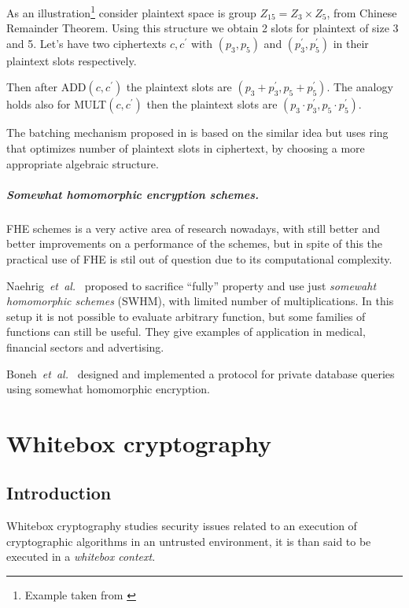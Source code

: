 \documentclass[11pt,oneside,final]{fithesis2}
\newcommand{\eal}{\emph{et~al.}}
\begin{document}
    As an illustration\footnote{Example taken from \citep{gentryAfrica}} consider plaintext space is group $Z_{15} = Z_3 \times Z_5$, from Chinese Remainder Theorem.
    Using this structure we obtain 2 slots for plaintext of size 3 and 5. Let's have two ciphertexts $c, c^{\prime}$
    with $(p_3, p_5)$ and $(p_3^{\prime}, p_5^{\prime})$ in their plaintext slots respectively. 

    Then after ADD$(c,c^{\prime})$ the plaintext slots are $(p_3 + p_3^{\prime}, p_5 + p_5^{\prime})$. The analogy holds also for 
    MULT$(c,c^{\prime})$ then the plaintext slots are $(p_3 \cdot p_3^{\prime}, p_5 \cdot p_5^{\prime})$.
    
    The batching mechanism proposed in \citep{Brakerski:2012:FHE:2090236.2090262} is based on the similar idea but uses 
    ring that optimizes number of plaintext slots in ciphertext, by choosing a more appropriate algebraic structure.

    \paragraph*{Somewhat homomorphic encryption schemes.} 
    FHE schemes is a very active area of research nowadays, with still better and better improvements on a performance of the schemes,
    but in spite of this the practical use of FHE is stil out of question due to its computational complexity. 
    
    Naehrig~\eal\ \citep{Naehrig:2011:HEP:2046660.2046682} proposed to sacrifice ``fully'' property and use just \emph{somewaht homomorphic schemes} (SWHM),
    with limited number of multiplications. In this setup it is not possible to evaluate arbitrary function, but some families of functions can still be
    useful. They give examples of application in medical, financial sectors and advertising.
    
    Boneh~\eal\ \citep{swhm-db01} designed and implemented a protocol for private database queries using somewhat homomorphic encryption.
    
\chapter{Whitebox cryptography}
    \section{Introduction}    
    Whitebox cryptography studies security issues related to an execution of cryptographic algorithms in an untrusted environment, it is 
    than said to be executed in a \emph{whitebox context}.
\end{document}
